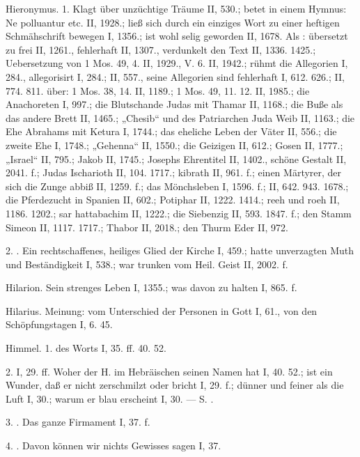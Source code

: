 Hieronymus. 1.  Klagt über unzüchtige Träume II, 530.; betet in einem Hymnus: Ne polluantur etc. II, 1928.; ließ sich durch ein einziges Wort zu einer heftigen Schmähschrift bewegen I, 1356.;
ist wohl selig geworden II, 1678. Als : übersetzt zu frei II, 1261., fehlerhaft II, 1307., verdunkelt den Text II, 1336. 1425.; Uebersetzung von 1 Mos. 49, 4. II, 1929., V. 6. II, 1942.; rühmt die Allegorien I, 284., allegorisirt I, 284.; II, 557., seine Allegorien sind fehlerhaft I, 612. 626.; II, 774. 811.  über: 1 Mos. 38, 14. II, 1189.; 1 Mos. 49, 11. 12. II, 1985.; die Anachoreten I, 997.; die Blutschande Judas mit Thamar II, 1168.; die Buße als das andere Brett II, 1465.; „Chesib“ und des Patriarchen Juda Weib II, 1163.; die Ehe Abrahams mit Ketura I, 1744.; das eheliche Leben der Väter II, 556.; die zweite Ehe I, 1748.; „Gehenna“ II, 1550.; die Geizigen II, 612.; Gosen II, 1777.; „Israel“ II, 795.; Jakob II, 1745.; Josephs Ehrentitel II, 1402., schöne Gestalt II, 2041. f.; Judas Ischarioth II, 104. 1717.; kibrath II, 961. f.; einen Märtyrer, der sich die Zunge abbiß II, 1259. f.; das Mönchsleben I, 1596. f.; II, 642. 943. 1678.; die Pferdezucht in Spanien II, 602.; Potiphar II, 1222. 1414.; reeh und roeh II, 1186. 1202.; sar hattabachim II, 1222.; die Siebenzig II, 593. 1847. f.; den Stamm Simeon II, 1117. 1717.; Thabor II, 2018.; den Thurm Eder II, 972.

2. . Ein rechtschaffenes, heiliges Glied der Kirche I, 459.; hatte unverzagten Muth und Beständigkeit I, 538.; war trunken vom Heil. Geist II, 2002. f.

Hilarion. Sein strenges Leben I, 1355.; was davon zu halten I, 865. f.

Hilarius. Meinung: vom Unterschied der Personen in Gott I, 61., von den Schöpfungstagen I, 6. 45.

Himmel. 1.  des Worts I, 35. ff. 40. 52.

2.  I, 29. ff. Woher der H. im Hebräischen seinen Namen hat I, 40. 52.; ist ein Wunder, daß er nicht zerschmilzt oder bricht I, 29. f.; dünner und feiner als die Luft I, 30.; warum er blau erscheint I, 30. — S. .

3. . Das ganze Firmament I, 37. f.

4. . Davon können wir nichts Gewisses sagen I, 37.


